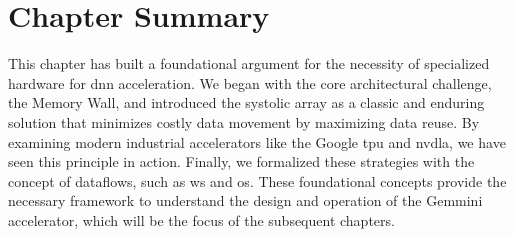 \FloatBarrier

\section{Chapter Summary}
This chapter has built a foundational argument for the necessity of specialized hardware for \acrshort{dnn} acceleration. We began with the core architectural challenge, the Memory Wall, and introduced the systolic array as a classic and enduring solution that minimizes costly data movement by maximizing data reuse. By examining modern industrial accelerators like the Google \acrshort{tpu} and \acrshort{nvdla}, we have seen this principle in action. Finally, we formalized these strategies with the concept of dataflows, such as \acrlong{ws} and \acrlong{os}. These foundational concepts provide the necessary framework to understand the design and operation of the Gemmini accelerator, which will be the focus of the subsequent chapters.